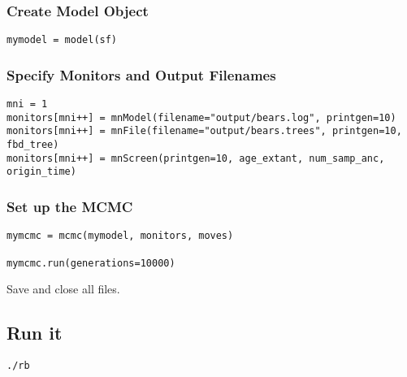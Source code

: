 \medskip
\subsubsection{Create Model Object}\label{subsub:RB-ModObj}


{\tt \begin{snugshade*}
\begin{lstlisting}
mymodel = model(sf)
\end{lstlisting}
\end{snugshade*}}

\medskip
\subsubsection{Specify Monitors and Output Filenames}\label{subsub:RB-Monitors}


{\tt \begin{snugshade*}
\begin{lstlisting}
mni = 1
monitors[mni++] = mnModel(filename="output/bears.log", printgen=10)
monitors[mni++] = mnFile(filename="output/bears.trees", printgen=10, fbd_tree)
monitors[mni++] = mnScreen(printgen=10, age_extant, num_samp_anc, origin_time)
\end{lstlisting}
\end{snugshade*}}

\medskip
\subsubsection{Set up the MCMC}


{\tt \begin{snugshade*}
\begin{lstlisting}
mymcmc = mcmc(mymodel, monitors, moves)

mymcmc.run(generations=10000)
\end{lstlisting}
\end{snugshade*}}

{\begin{framed}
Save and close all files.
\end{framed}}

\bigskip
\subsection{Run it}\label{subsect:RB-RunMCMC}


{\tt \begin{snugshade*}
\begin{lstlisting}
./rb
\end{lstlisting}
\end{snugshade*}}

